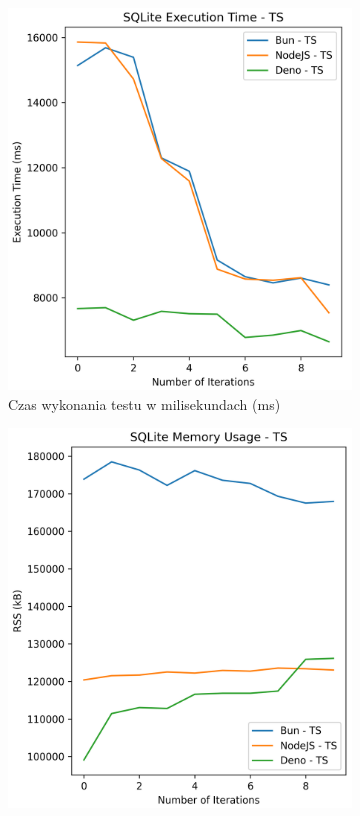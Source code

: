 \begin{figure}[H]
  \centering
  \begin{subfigure}[b]{0.44\textwidth}
    \centering
    \includegraphics[width=\textwidth]{Figures/database/sqlite_10_1000_ts_time.png}
    \caption{Czas wykonania testu w milisekundach (ms)}
    \label{fig:database_e1_ts_time}
  \end{subfigure}
  \begin{subfigure}[b]{0.44\textwidth}
    \centering
    \includegraphics[width=\textwidth]{Figures/database/sqlite_10_1000_ts_memory.png}

\end{subfigure}
\end{figure}
